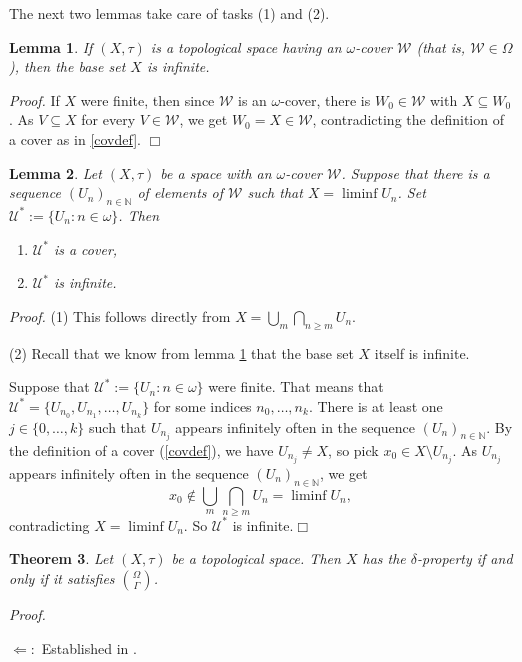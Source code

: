 \documentclass[12pt]{amsart}
\newtheorem{lemma}{\bf Lemma}[section]
\newtheorem{theorem}[lemma]{\bf Theorem}
\gdef\cal{\mathcal}
\begin{document}
The next two lemmas take care of tasks (1) and (2).

\begin{lemma}\label{omegalemma}
	If $(X,\tau)$ is a topological space having an $\omega$-cover 
	${\cal W}$ (that is, ${\cal W}\in \Omega$), 
	then the base set $X$ is infinite.
\end{lemma}
{\em Proof.} If $X$ were finite, then since ${\cal W}$ is an $\omega$-cover,
there is $W_0\in {\cal W}$ with $X\subseteq W_0$. As $V\subseteq X$ for every
$V\in {\cal W}$, we get $W_0 = X\in {\cal W}$, contradicting the definition of a cover
as in \ref{covdef}. \hfill{$\Box$}

\begin{lemma}\label{gammalemma}
Let $(X,\tau)$ be a space with an $\omega$-cover ${\cal W}$.
Suppose that there is a sequence $(U_n)_{n\in\mathbb{N}}$
of elements of ${\cal W}$ such that $X =\liminf U_n$.
Set ${\cal U}^* := \{U_n:n\in \omega\}$. Then
\begin{enumerate}
\item ${\cal U}^*$ is a cover, 
\item ${\cal U}^*$ is infinite.
\end{enumerate}
\end{lemma}
{\em Proof.} (1) This follows directly from $X = \bigcup_m\bigcap_{n\geq m}U_n$.

(2) 
Recall that we know from lemma \ref{omegalemma} that the base set
$X$ itself is infinite. 

Suppose that ${\cal U}^* := \{U_n:n\in \omega\}$ were finite.
That means that ${\cal U}^*=\{U_{n_0},U_{n_1},\ldots, U_{n_k}\}$ for some
indices $n_0,\ldots,n_k$. There is at least one $j\in\{0,\ldots,k\}$ such that 
$U_{n_j}$ appears infinitely often in the sequence $(U_n)_{n\in\mathbb{N}}$. 
By the definition of a cover (\ref{covdef}), we have $U_{n_j} \neq X$, so pick 
$x_0\in X\setminus U_{n_j}$. As
$U_{n_j}$ appears infinitely often in the sequence $(U_n)_{n\in\mathbb{N}}$,
we get $$x_0\notin \bigcup_m\bigcap_{n\geq m}U_n=\liminf U_n,$$
contradicting $X = \liminf U_n$. So ${\cal U}^*$ is infinite.\hfill{$\Box$}

\begin{theorem}\label{main}
Let $(X,\tau)$ be a topological space. Then $X$ has
the $\delta$-property if and only if it 
satisfies ${\Omega\choose\Gamma}$.
\end{theorem}
{\it Proof.}

$\Leftarrow:$ Established in \cite{gamma}.
\end{document}
